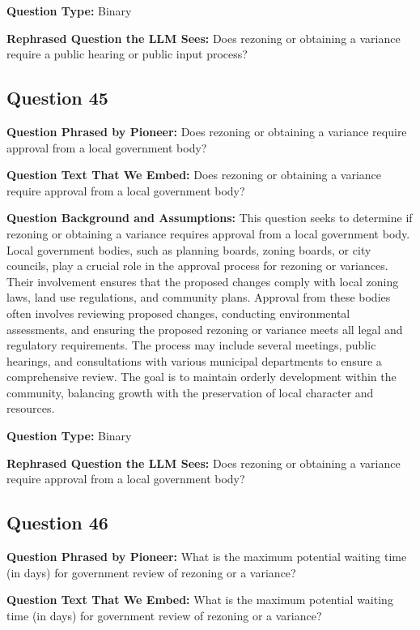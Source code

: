 \noindent\textbf{Question Type:} Binary

\noindent\textbf{Rephrased Question the LLM Sees:} Does rezoning or obtaining a variance require a public hearing or public input process?

\vspace{1cm}
\subsection*{Question 45}
\noindent\textbf{Question Phrased by Pioneer:} Does rezoning or obtaining a variance require approval from a local government body?

\noindent\textbf{Question Text That We Embed:} Does rezoning or obtaining a variance require approval from a local government body?

\noindent\textbf{Question Background and Assumptions:} This question seeks to determine if rezoning or obtaining a variance requires approval from a local government body. Local government bodies, such as planning boards, zoning boards, or city councils, play a crucial role in the approval process for rezoning or variances. Their involvement ensures that the proposed changes comply with local zoning laws, land use regulations, and community plans. Approval from these bodies often involves reviewing proposed changes, conducting environmental assessments, and ensuring the proposed rezoning or variance meets all legal and regulatory requirements. The process may include several meetings, public hearings, and consultations with various municipal departments to ensure a comprehensive review. The goal is to maintain orderly development within the community, balancing growth with the preservation of local character and resources.

\noindent\textbf{Question Type:} Binary

\noindent\textbf{Rephrased Question the LLM Sees:} Does rezoning or obtaining a variance require approval from a local government body?

\vspace{1cm}
\subsection*{Question 46}
\noindent\textbf{Question Phrased by Pioneer:} What is the maximum potential waiting time (in days) for government review of rezoning or a variance?

\noindent\textbf{Question Text That We Embed:} What is the maximum potential waiting time (in days) for government review of rezoning or a variance?

